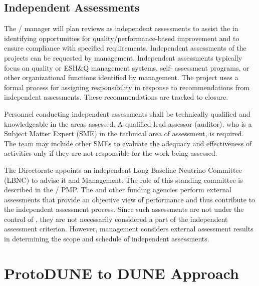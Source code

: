 \subsection{Independent Assessments}

The /  manager will plan reviews as
independent assessments to assist the  
in identifying opportunities for quality/performance-based
improvement and to ensure compliance with specified
requirements. Independent assessments of the  projects can
be requested by  management. Independent assessments
typically focus on quality or ESH\&Q management systems, self-
assessment programs, or other organizational functions identified by
management. The  project uses a formal process for
assigning responsibility in response to recommendations from
independent assessments. These recommendations are tracked to closure.

Personnel conducting independent assessments shall be technically
qualified and knowledgeable in the areas assessed. A qualified lead
assessor (auditor), who is a Subject Matter Expert (SME) in the
technical area of assessment, is required. The team may include other
SMEs to evaluate the adequacy and effectiveness of activities only if
they are not responsible for the work being assessed.

The \fnal Directorate appoints an independent Long Baseline Neutrino
Committee (LBNC) to advise it and  Management. The role of
this standing committee is described in the /
PMP. The  and other funding agencies perform external
assessments that provide an objective view of performance and thus
contribute to the independent assessment process. Since such
assessments are not under the control of , they are not
necessarily considered a part of the independent assessment
criterion. However,  management considers external
assessment results in determining the scope and schedule of
independent assessments.

\section{ProtoDUNE to DUNE  Approach}


